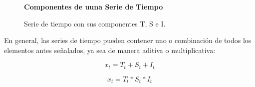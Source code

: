 \begin{figure}[h]
	\centering
	\textbf{Componentes de uuna Serie de Tiempo}\par\medskip
	\caption{Serie de tiempo con sus componentes T, S e I.}\label{figura10}
\end{figure}

En general, las series de tiempo pueden contener uno o combinaci\'on de todos los elementos antes se\~nalados, ya sea de manera aditiva o multiplicativa:

\begin{equation*}
x_t = T_t + S_t + I_t
\end{equation*}

\begin{equation*}
x_t = T_t * S_t * I_t
\end{equation*}

